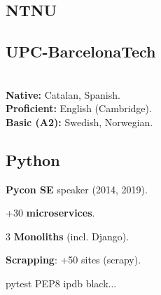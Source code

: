 \documentclass[a4paper]{MagicalCV}
\begin{document}
\lastupdated


\begin{minipage}[t]{0.33\textwidth}


\sectionsep
\subsection{NTNU}
\vspace{\topsep} %

\sectionsep

\subsection{UPC-BarcelonaTech}
\sectionsep

 \\
\textbf{Native: } Catalan, Spanish. \\
\textbf{Proficient: } English (Cambridge). \\
\textbf{Basic (A2): } Swedish, Norwegian.\\
\sectionsep

\sectionsep
\subsection{Python}
\begin{tightemize}
\item {\bf Pycon SE} speaker (2014, 2019). %
\item +30 {\bf microservices}.
\item 3 {\bf Monoliths} (incl. Django).
\item {\bf Scrapping}: +50 sites (scrapy).
\item pytest \textbullet{} PEP8 \textbullet{} ipdb \textbullet{} black...
\end{tightemize}
\sectionsep


\end{minipage}
\end{document}

